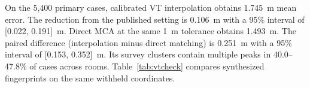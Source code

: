 On the 5,400 primary cases, calibrated VT interpolation obtains 1.745~m mean error. The reduction from the published setting is 0.106~m with a 95\% interval of [0.022, 0.191]~m. Direct MCA at the same 1~m tolerance obtains 1.493~m. The paired difference (interpolation minus direct matching) is 0.251~m with a 95\% interval of [0.153, 0.352]~m. Its survey clusters contain multiple peaks in 40.0--47.8\% of cases across rooms. Table~\ref{tab:vtcheck} compares synthesized fingerprints on the same withheld coordinates.
